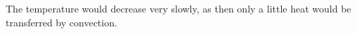 The temperature would decrease very slowly, as then only a little heat would be transferred by convection.